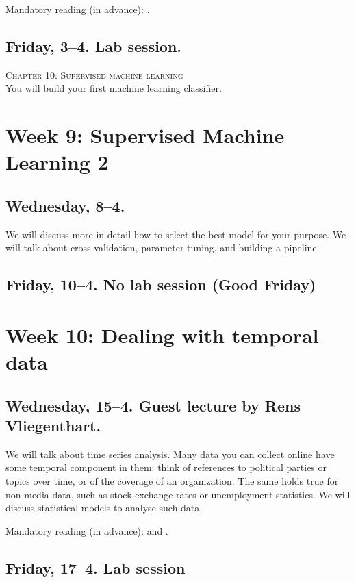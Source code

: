 Mandatory reading (in advance): \cite{burscher2014}. 

\subsection*{Friday, 3--4. Lab session.}
\textsc{ Chapter 10: Supervised machine learning}\\
You will build your first machine learning classifier.



\section*{Week 9: Supervised Machine Learning 2}

\subsection*{Wednesday, 8--4.}
We will discuss more in detail how to select the best model for your purpose. We will talk about cross-validation, parameter tuning, and building a pipeline.

\subsection*{Friday, 10--4. No lab session (Good Friday)}



\section*{Week 10: Dealing with temporal data}

\subsection*{Wednesday, 15--4. Guest lecture by Rens Vliegenthart.}
We will talk about time series analysis. Many data you can collect online have some temporal component in them: think of references to political parties or topics over time, or of the coverage of an organization. The same holds true for non-media data, such as stock exchange rates or unemployment statistics. We will discuss statistical models to analyse such data.


Mandatory reading (in advance): \cite{Vliegenthart2014} and \cite{Strycharz2018}.


\subsection*{Friday, 17--4. Lab session}




